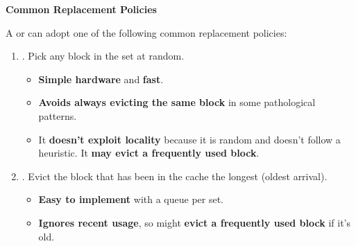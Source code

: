 \highspace
\begin{flushleft}
    \textcolor{Green3}{ \textbf{Common Replacement Policies}}
\end{flushleft}
A  or  can adopt one of the following common replacement policies:
\begin{enumerate}
    \item {}. Pick any block in the set at random.
    \begin{itemize}
        \item[\textcolor{Green3}{\faIcon{check}}] \textbf{Simple hardware} and \textbf{fast}.
        \item[\textcolor{Green3}{\faIcon{check}}] \textbf{Avoids always evicting the same block} in some pathological patterns.
        \item[\textcolor{Red2}{\faIcon{times}}] It \textbf{doesn't exploit locality} because it is random and doesn't follow a heuristic. It \textbf{may evict a frequently used block}.
    \end{itemize}

    \item {}. Evict the block that has been in the cache the longest (oldest arrival).
    \begin{itemize}
        \item[\textcolor{Green3}{\faIcon{check}}] \textbf{Easy to implement} with a queue per set.
        \item[\textcolor{Red2}{\faIcon{times}}] \textbf{Ignores recent usage}, so might \textbf{evict a frequently used block} if it's old.
    \end{itemize}


\end{enumerate}
